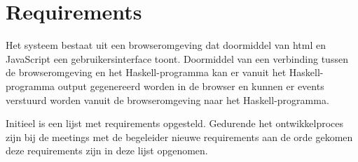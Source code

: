 \section{Requirements} \label{sec:requirements}


Het systeem bestaat uit een browseromgeving dat doormiddel van html en JavaScript een gebruikersinterface toont. Doormiddel van een verbinding tussen de browseromgeving en het Haskell-programma kan er vanuit het Haskell-programma output gegenereerd worden in de browser en kunnen er events verstuurd worden vanuit de browseromgeving naar het Haskell-programma.

Initieel is een lijst met requirements opgesteld. Gedurende het ontwikkelproces zijn bij de meetings met de begeleider nieuwe requirements aan de orde gekomen deze requirements zijn in deze lijst opgenomen.

